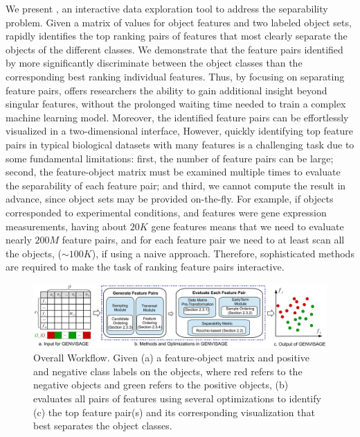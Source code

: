 We present \genviz,
an interactive data exploration tool to address the separability problem.
Given a matrix of values for object features
and two labeled object sets, \genviz rapidly identifies
the top ranking pairs of features
that most clearly separate the objects of
the different classes.
We demonstrate that the feature pairs identified by \genviz more significantly
discriminate between the object classes than the corresponding
best ranking individual features.
Thus, by focusing on separating feature pairs, \genviz
offers researchers the ability to gain additional
insight beyond singular features, without the prolonged waiting time
needed to train a complex machine learning model.
Moreover, the identified feature pairs can be effortlessly
visualized in a two-dimensional interface, 
However, quickly identifying top feature pairs
in typical biological datasets with many features
is a challenging task due to some fundamental limitations:
first, the number of feature pairs can be large;
second, the feature-object matrix must be examined
multiple times to evaluate the separability of
each feature pair;
and third, we cannot compute the result in advance, since
object sets may be provided on-the-fly.
For example, if objects corresponded to experimental
conditions, and features were gene expression measurements,
having about $20K$ gene features
means that we need to evaluate nearly $200M$ feature pairs,
and for each feature pair we need to at least scan all the objects,
($\sim100K$), if using a naive approach.
Therefore, sophisticated methods are required
to make the task of ranking feature pairs interactive.

\begin{figure}[t]
 \centering
 \includegraphics[width=0.9\linewidth]{fig/workflow2.pdf}
 \vspace{-10pt}
\caption{Overall \genviz Workflow.
Given (a) a feature-object matrix and positive and negative class labels on the objects, where red refers to the negative objects and green refers to the positive objects, \genviz (b) evaluates all pairs of features using several optimizations to identify (c) the top feature pair(s) and its corresponding visualization that best separates the object classes.}
\label{fig:workflow}
\vspace{-10pt}
\end{figure}


